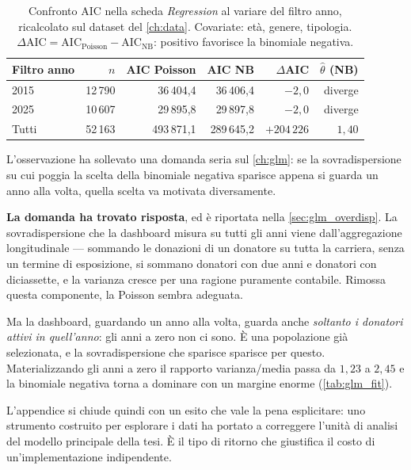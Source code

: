 \begin{table}[ht]
\centering
\caption{Confronto AIC nella scheda \emph{Regression} al variare del filtro
anno, ricalcolato sul dataset del \cref{ch:data}. Covariate: età, genere,
tipologia. $\Delta\text{AIC} = \text{AIC}_{\text{Poisson}} -
\text{AIC}_{\text{NB}}$: positivo favorisce la binomiale negativa.}
\label{tab:dash_overdisp}
\begin{tabular}{@{}lrrrrr@{}}
\toprule
\textbf{Filtro anno} & \textbf{$n$} & \textbf{AIC Poisson} & \textbf{AIC NB} &
\textbf{$\Delta$AIC} & \textbf{$\hat{\theta}$ (NB)} \\
\midrule
2015  & 12\,790 & 36\,404{,}4  & 36\,406{,}4  & $-2{,}0$    & diverge \\
2025  & 10\,607 & 29\,895{,}8  & 29\,897{,}8  & $-2{,}0$    & diverge \\
Tutti & 52\,163 & 493\,871{,}1 & 289\,645{,}2 & $+204\,226$ & $1{,}40$ \\
\bottomrule
\end{tabular}
\end{table}

L'osservazione ha sollevato una domanda seria sul \cref{ch:glm}: se la
sovradispersione su cui poggia la scelta della binomiale negativa sparisce
appena si guarda un anno alla volta, quella scelta va motivata diversamente.

\textbf{La domanda ha trovato risposta}, ed è riportata nella
\cref{sec:glm_overdisp}. La sovradispersione che la dashboard misura su tutti
gli anni viene dall'aggregazione longitudinale --- sommando le donazioni di un
donatore su tutta la carriera, senza un termine di esposizione, si sommano
donatori con due anni e donatori con diciassette, e la varianza cresce per una
ragione puramente contabile. Rimossa questa componente, la Poisson sembra
adeguata.

Ma la dashboard, guardando un anno alla volta, guarda anche \emph{soltanto i
donatori attivi in quell'anno}: gli anni a zero non ci sono. È una popolazione
già selezionata, e la sovradispersione che sparisce sparisce per questo.
Materializzando gli anni a zero il rapporto varianza/media passa da $1{,}23$ a
$2{,}45$ e la binomiale negativa torna a dominare con un margine enorme
(\cref{tab:glm_fit}).

L'appendice si chiude quindi con un esito che vale la pena esplicitare: uno
strumento costruito per esplorare i dati ha portato a correggere l'unità di
analisi del modello principale della tesi. È il tipo di ritorno che giustifica
il costo di un'implementazione indipendente.

